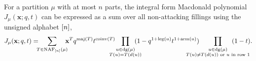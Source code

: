 \begin{proposition} \label{prop:J-NAF-unsigned}
	For a partition \(\mu\) with at most \(n\) parts,
	the integral form Macdonald polynomial \(J_\mu(\mathbf{x}; q, t)\) can be expressed as a sum over all non-attacking fillings using the unsigned alphabet \([n]\),
	\begin{equation} \label{eq:J-NAF-unsigned}
		J_\mu(\mathbf{x}; q, t)
		=
		\mkern -10mu
		\sum_{T \in \NAF[\interval{n}](\mu)}
		\mkern -10mu
		\mathbf{x}^T
		q^{\maj(T)}
		t^{\coinv(T)}
		\mkern -20mu
		\prod_{\substack{u \in \dg(\mu) \\ T(u) = T(\south{u})}}
		\mkern -20mu
		(1 - q^{1 + \leg(u)} t^{1 + \arm(u)})
		\mkern -40mu
		\prod_{\substack{u \in \dg(\mu) \\ T(u) \neq T(\south{u}) \text{ or } u \text{ in row } 1}}
		\mkern -50mu
		(1 - t).
	\end{equation}
\end{proposition}

